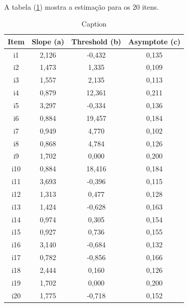    \paragraph{}
   A tabela (\ref{tab:estimacao}) mostra a estimação para os 20 itens.
   \begin{table}[!h]
       \centering
       \begin{tabular}{c|c|c|c}
            \hline
            Item &	Slope (a) &	Threshold (b)&	Asymptote (c)\\
            \hline
            \hline
            i1 &	2,126 &	-0,432 & 0,135 \\
            \hline
            i2 &	1,473 &	1,335 &	0,109 \\
            \hline
            i3 &	1,557 &	2,135 &	0,113 \\
            \hline
            i4 &	0,879 &	12,361 &	0,211 \\
            \hline
            i5 &	3,297 &	-0,334 &	0,136 \\
            \hline
            i6 &	0,884 &	19,457 & 0,184 \\
            \hline
            i7 &	0,949 &	4,770 &	0,102 \\
            \hline
            i8 &	0,868 &	4,784 &	0,126 \\
            \hline
            i9 &	1,702 &	0,000 &	0,200 \\ 
            \hline
            i10 &	0,884 &	18,416 &	0,184 \\
            \hline
            i11 &	3,693 &	-0,396 & 0,115 \\
            \hline
            i12 &	1,313 &	0,477 &	0,128 \\
            \hline
            i13 &	1,424 &	-0,628 &	0,163 \\
            \hline
            i14 &	0,974 &	0,305 & 0,154 \\
            \hline
            i15 &	0,927 &	0,736 &	0,155 \\
            \hline
            i16 &	3,140 &	-0,684 &	0,132 \\
            \hline
            i17 &	0,782 &	-0,856 &	0,166 \\
            \hline
            i18 &	2,444 &	0,160 &	0,126 \\
            \hline
            i19 &	1,702 &	0,000 &	0,200 \\
            \hline
            i20 &	1,775 &	-0,718 &	0,152 \\
            \hline
       \end{tabular}
       \caption{Caption}
       \label{tab:estimacao}
   \end{table}
